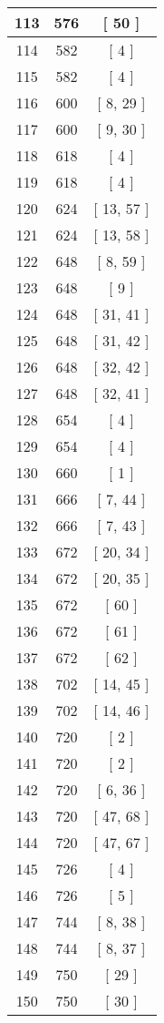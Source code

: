 \begin{center}
\begin{longtable}[H]{|| c c c ||}
113 & 576 & [ 50 ]
\\\hline
114 & 582 & [ 4 ]
\\\hline
115 & 582 & [ 4 ]
\\\hline
116 & 600 & [ 8, 29 ]
\\\hline
117 & 600 & [ 9, 30 ]
\\\hline
118 & 618 & [ 4 ]
\\\hline
119 & 618 & [ 4 ]
\\\hline
120 & 624 & [ 13, 57 ]
\\\hline
121 & 624 & [ 13, 58 ]
\\\hline
122 & 648 & [ 8, 59 ]
\\\hline
123 & 648 & [ 9 ]
\\\hline
124 & 648 & [ 31, 41 ]
\\\hline
125 & 648 & [ 31, 42 ]
\\\hline
126 & 648 & [ 32, 42 ]
\\\hline
127 & 648 & [ 32, 41 ]
\\\hline
128 & 654 & [ 4 ]
\\\hline
129 & 654 & [ 4 ]
\\\hline
130 & 660 & [ 1 ]
\\\hline
131 & 666 & [ 7, 44 ]
\\\hline
132 & 666 & [ 7, 43 ]
\\\hline
133 & 672 & [ 20, 34 ]
\\\hline
134 & 672 & [ 20, 35 ]
\\\hline
135 & 672 & [ 60 ]
\\\hline
136 & 672 & [ 61 ]
\\\hline
137 & 672 & [ 62 ]
\\\hline
138 & 702 & [ 14, 45 ]
\\\hline
139 & 702 & [ 14, 46 ]
\\\hline
140 & 720 & [ 2 ]
\\\hline
141 & 720 & [ 2 ]
\\\hline
142 & 720 & [ 6, 36 ]
\\\hline
143 & 720 & [ 47, 68 ]
\\\hline
144 & 720 & [ 47, 67 ]
\\\hline
145 & 726 & [ 4 ]
\\\hline
146 & 726 & [ 5 ]
\\\hline
147 & 744 & [ 8, 38 ]
\\\hline
148 & 744 & [ 8, 37 ]
\\\hline
149 & 750 & [ 29 ]
\\\hline
150 & 750 & [ 30 ]
\\\hline

\end{longtable}
\end{center}

